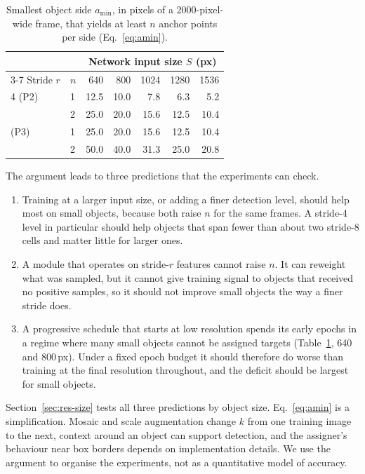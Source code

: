 \documentclass[preprint,12pt]{elsarticle}
\begin{document}
\begin{table}[t]
\centering
\caption{Smallest object side $a_{\min}$, in pixels of a 2000-pixel-wide frame,
that yields at least $n$ anchor points per side (Eq.~\ref{eq:amin}).}
\label{tab:amin}
\small
\begin{tabular}{llrrrrr}
\toprule
 & & \multicolumn{5}{c}{Network input size $S$ (px)} \\
\cmidrule(lr){3-7}
Stride $r$ & $n$ & 640 & 800 & 1024 & 1280 & 1536 \\
\midrule
4 (P2) & 1 & 12.5 & 10.0 &  7.8 &  6.3 &  5.2 \\
       & 2 & 25.0 & 20.0 & 15.6 & 12.5 & 10.4 \\
\addlinespace
8 (P3) & 1 & 25.0 & 20.0 & 15.6 & 12.5 & 10.4 \\
       & 2 & 50.0 & 40.0 & 31.3 & 25.0 & 20.8 \\
\bottomrule
\end{tabular}
\end{table}

The argument leads to three predictions that the experiments can check.
\begin{enumerate}
  \item[P1.] Training at a larger input size, or adding a finer detection level,
  should help most on small objects, because both raise $n$ for the same frames. A
  stride-4 level in particular should help objects that span fewer than about two
  stride-8 cells and matter little for larger ones.
  \item[P2.] A module that operates on stride-$r$ features cannot raise $n$. It can
  reweight what was sampled, but it cannot give training signal to objects that
  received no positive samples, so it should not improve small objects the way a
  finer stride does.
  \item[P3.] A progressive schedule that starts at low resolution spends its early
  epochs in a regime where many small objects cannot be assigned targets
  (Table~\ref{tab:amin}, 640 and 800\,px). Under a fixed epoch budget it should
  therefore do worse than training at the final resolution throughout, and the
  deficit should be largest for small objects.
\end{enumerate}
Section~\ref{sec:res-size} tests all three predictions by object size.
Eq.~\eqref{eq:amin} is a simplification. Mosaic and scale augmentation change $k$
from one training image to the next, context around an object can support
detection, and the assigner's behaviour near box borders depends on implementation
details. We use the argument to organise the experiments, not as a quantitative
model of accuracy.
\end{document}
